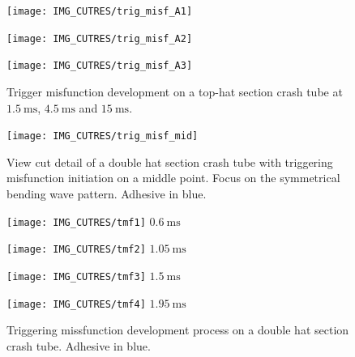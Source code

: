 \documentclass[cmfonts]{witpress}
\begin{document}
\begin{figure}
	\centering
	\begin{minipage}[b]{.65\linewidth}
		\texttt{[image: IMG\_CUTRES/trig\_misf\_A1]}
	\end{minipage}
	\quad
	\begin{minipage}[b]{.65\linewidth}
		\texttt{[image: IMG\_CUTRES/trig\_misf\_A2]}
	\end{minipage}
	\quad
	\begin{minipage}[b]{.65\linewidth}
		\texttt{[image: IMG\_CUTRES/trig\_misf\_A3]}
	\end{minipage}
	\caption{Trigger misfunction development on a top-hat section crash tube at $\SI{1.5}{\ms}$, $\SI{4.5}{\ms}$ and $\SI{15}{\ms}$.}
	\label{fig:trig_misf_A}
\end{figure}

\begin{figure}
	\centering
	\texttt{[image: IMG\_CUTRES/trig\_misf\_mid]}
	\caption[View cut detail of a double hat section crash tube with triggering misfunction initiation on a middle point.]{View cut detail of a double hat section crash tube with triggering misfunction initiation on a middle point. Focus on the symmetrical bending wave pattern. Adhesive in blue.}
	\label{fig:trig_misf_mid}
\end{figure}


\begin{figure}
	\centering
	\begin{minipage}[b]{.22\linewidth}
		\centering
		\texttt{[image: IMG\_CUTRES/tmf1]}
		$\SI{0.6}{\ms}$
	\end{minipage}
	\quad
	\begin{minipage}[b]{.22\linewidth}
		\centering
		\texttt{[image: IMG\_CUTRES/tmf2]}
		$\SI{1.05}{\ms}$
	\end{minipage}
	\quad
	\begin{minipage}[b]{.22\linewidth}
		\centering
		\texttt{[image: IMG\_CUTRES/tmf3]}
		$\SI{1.5}{\ms}$
	\end{minipage}
	\quad
	\begin{minipage}[b]{.22\linewidth}
		\centering
		\texttt{[image: IMG\_CUTRES/tmf4]}
		$\SI{1.95}{\ms}$
	\end{minipage}
	\caption[Triggering missfunction development process on a double hat section crash tube.]{Triggering missfunction development process on a double hat section crash tube. Adhesive in blue.}
	\label{fig:tmf}
\end{figure}
\end{document}
